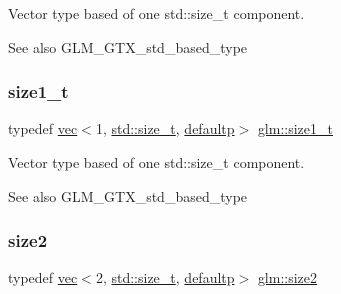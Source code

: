 Vector type based of one std\+::size\+\_\+t component. \begin{DoxySeeAlso}{See also}
G\+L\+M\+\_\+\+G\+T\+X\+\_\+std\+\_\+based\+\_\+type 
\end{DoxySeeAlso}
\mbox{\label{group__gtx__std__based__type_ga5bf40bbca3cb66bbd7cc0c389c3c0c56}} 
\subsubsection{\texorpdfstring{size1\+\_\+t}{size1\_t}}
{\footnotesize\ttfamily typedef \mbox{\hyperlink{structglm_1_1vec}{vec}}$<$1, \mbox{\hyperlink{_s_d_l__config__winrt_8h_a7c94ea6f8948649f8d181ae55911eeaf}{std\+::size\+\_\+t}}, \mbox{\hyperlink{namespaceglm_a36ed105b07c7746804d7fdc7cc90ff25a9d21ccd8b5a009ec7eb7677befc3bf51}{defaultp}}$>$ \mbox{\hyperlink{group__gtx__std__based__type_ga5bf40bbca3cb66bbd7cc0c389c3c0c56}{glm\+::size1\+\_\+t}}}

Vector type based of one std\+::size\+\_\+t component. \begin{DoxySeeAlso}{See also}
G\+L\+M\+\_\+\+G\+T\+X\+\_\+std\+\_\+based\+\_\+type 
\end{DoxySeeAlso}
\mbox{\label{group__gtx__std__based__type_ga432937b68775c79e4556150e769c6e6b}} 
\subsubsection{\texorpdfstring{size2}{size2}}
{\footnotesize\ttfamily typedef \mbox{\hyperlink{structglm_1_1vec}{vec}}$<$2, \mbox{\hyperlink{_s_d_l__config__winrt_8h_a7c94ea6f8948649f8d181ae55911eeaf}{std\+::size\+\_\+t}}, \mbox{\hyperlink{namespaceglm_a36ed105b07c7746804d7fdc7cc90ff25a9d21ccd8b5a009ec7eb7677befc3bf51}{defaultp}}$>$ \mbox{\hyperlink{group__gtx__std__based__type_ga432937b68775c79e4556150e769c6e6b}{glm\+::size2}}}

